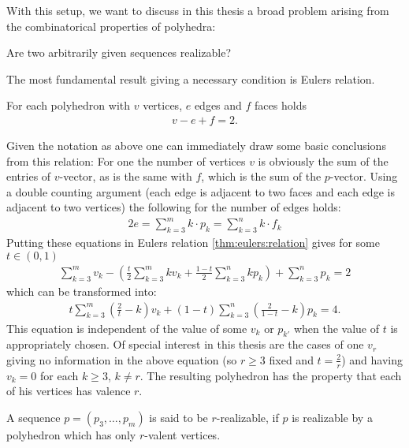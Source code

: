 With this setup, we want to discuss in this thesis a broad problem arising from the combinatorical properties of polyhedra:
\begin{problem} Are two arbitrarily given sequences realizable?
\end{problem}
The most fundamental result giving a necessary condition is Eulers relation.
\begin{theorem}\label{thm:eulers:relation}
  For each polyhedron with $v$ vertices, $e$ edges and $f$ faces holds
  \begin{align*}
    v - e + f = 2.
  \end{align*}
\end{theorem}
Given the notation as above one can immediately draw some basic conclusions from this relation: For one the number of vertices $v$ is obviously the sum of the entries of $v$-vector, as is the same with $f$, which is the sum of the $p$-vector. Using a double counting argument (each edge is adjacent to two faces and each edge is adjacent to two vertices) the following for the number of edges holds:
\begin{align*}
  2e = \sum_{k=3}^{m} k \cdot p_k = \sum_{k=3}^{n} k \cdot f_k
\end{align*}
Putting these equations in Eulers relation \autoref{thm:eulers:relation} gives for some $t \in (0, 1)$
\begin{align*}
  \sum_{k=3}^m v_k - \left(\frac{t}{2} \sum_{k=3}^m k v_k + \frac{1-t}{2} \sum_{k=3}^n k p_k \right) + \sum_{k=3}^n p_k = 2
\end{align*}
which can be transformed into:
\begin{align}
  t \sum_{k=3}^m \left(\frac{2}{t} - k \right) v_k + (1-t) \sum_{k=3}^n \left( \frac{2}{1-t} - k \right) p_k = 4. \label{eq:general:vp:relation}
\end{align}
This equation is independent of the value of some $v_k$ or $p_{k'}$ when the value of $t$ is appropriately chosen. Of special interest in this thesis are the cases of one $v_r$ giving no information in the above equation (so $r \geq 3$ fixed and $t = \frac{2}{r}$) and having $v_{k} = 0$ for each $k \geq 3$, $k \neq r$. The resulting polyhedron has the property that each of his vertices has valence $r$. 
\begin{definition}[$r$-realizable]\label{def:r:realizable}
  A sequence $p = (p_3, \dots, p_m)$ is said to be $r$-realizable, if $p$ is realizable by a polyhedron which has only $r$-valent vertices.
\end{definition}
